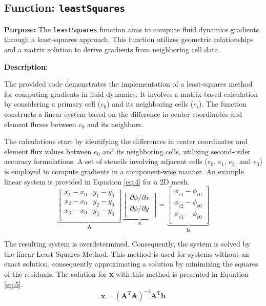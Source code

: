 \documentclass{article}
\begin{document}
\subsection{Function: \texttt{leastSquares}}


\textbf{Purpose:}
The \texttt{leastSquares} function aims to compute fluid dynamics gradients through a least-squares approach. This function utilizes geometric relationships and a matrix solution to derive gradients from neighboring cell data.

\textbf{Description:}

The provided code demonstrates the implementation of a least-squares method for computing gradients in fluid dynamics. It involves a matrix-based calculation by considering a primary cell ($e_0$) and its neighboring cells ($e_i$). The function constructs a linear system based on the difference in center coordinates and element fluxes between $e_0$ and its neighbors.

The calculations start by identifying the differences in center coordinates and element flux values between $e_0$ and its neighboring cells, utilizing second-order accuracy formulations. A set of stencils involving adjacent cells ($e_0$, $e_1$, $e_2$, and $e_3$) is employed to compute gradients in a component-wise manner. An example linear system is provided in Equation \ref{eq:4} for a 2D mesh. 
\begin{equation}
\underbrace{
\begin{bmatrix}
x_1 - x_0 & y_1 - y_0 \\
x_2 - x_0 & y_2 - y_0 \\
x_3 - x_0 & y_3 - y_0 \\
\end{bmatrix}
}_{\mathbf{A}}
\underbrace{
\begin{bmatrix}
\partial \phi / \partial x \\
\partial \phi / \partial y \\
\end{bmatrix}
}_{\mathbf{x}}
=
\underbrace{
\begin{bmatrix}
\phi_{e1} - \phi_{e0} \\
\phi_{e2} - \phi_{e0} \\
\phi_{e3} - \phi_{e0} \\
\end{bmatrix}
}_{\mathbf{b}}
\label{eq:4}
\end{equation}

The resulting system is overdetermined. Consequently, the system is solved by the linear Least Squares Method. This method is used for systems without an exact solution, consequently approximating a solution by minimizing the squares of the residuals. The solution for \textbf{x} with this method is presented in Equation \ref{eq:5}.
\begin{equation}
\mathbf{x} = \left( \mathbf{A}^\mathrm{T} \mathbf{A} \right)^{-1} \mathbf{A}^\mathrm{T} \mathbf{b}
\label{eq:5}
\end{equation}
\end{document}
